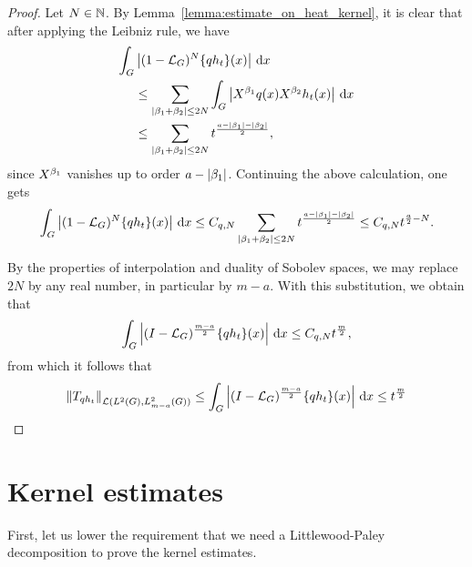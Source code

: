\begin{proof}
    Let $N \in \N$.
    By Lemma~\ref{lemma:estimate_on_heat_kernel},
    it is clear that after applying the Leibniz rule,
    we have
    \begin{align*}
        \int_\Group &\abs {(1 - \Laplacian)^N \{q h_t\}(x)} \dd x\\
        &\leq \sum_{\abs{\beta_1 + \beta_2} \leq 2N} \int_\Group \abs {\LeftDifferentialOperator {\beta_1} q(x) \LeftDifferentialOperator {\beta_2} h_t(x)} \dd x\\
        &\leq \sum_{\abs{\beta_1 + \beta_2} \leq 2N} t^{\frac {a - \abs {\beta_1} - \abs{\beta_2}} 2},
    \end{align*}
    since $\LeftDifferentialOperator {\beta_1}$ vanishes up to order $a - \abs {\beta_1}$.
    Continuing the above calculation,
    one gets
    \begin{align*}
        \int_\Group \abs {(1 - \Laplacian)^N \{q h_t\}(x)} \dd x
        \leq C_{q, N} \sum_{\abs{\beta_1 + \beta_2} \leq 2N} t^{\frac {a - \abs {\beta_1} - \abs{\beta_2}} 2}
        \leq C_{q, N} t^{\frac a 2 - N}.
    \end{align*}

    By the properties of interpolation and duality of Sobolev spaces,
    we may replace $2N$ by any real number,
    in particular by $m - a$.
    With this substitution,
    we obtain that
    \begin{align*}
        \int_\Group \abs {\BesselPotential {m - a} \{q h_t\}(x)} \dd x
        \leq C_{q, N} t^{\frac m 2},
    \end{align*}
    from which it follows that
    \begin{align*}
        \norm [\Lin {\Lebesgue 2 \Group, \Sobolev {m - a}}] {T_{q h_t}}
        \leq \int_\Group \abs {\BesselPotential {m - a} \{q h_t\}(x)} \dd x
        \leq t^{\frac m 2}
    \end{align*}
\end{proof}

\section{Kernel estimates}

First,
let us lower the requirement that we need a Littlewood-Paley decomposition
to prove the kernel estimates.

